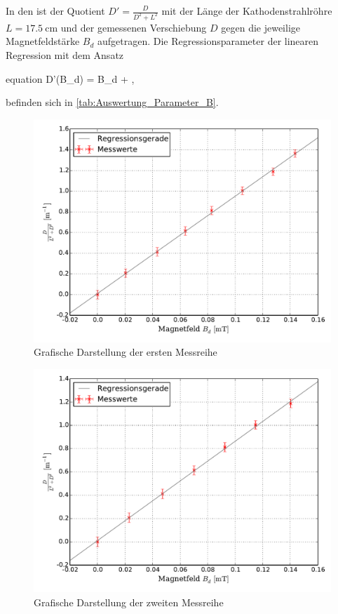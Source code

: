 		
		
		
		In den  
		ist der Quotient $D'=\frac{D}{D^{2} + L^{2}}$ mit der Länge der Kathodenstrahlröhre 
		$L = \SI{17.5}{\centi\meter}$ und der gemessenen Verschiebung $D$ gegen die
		jeweilige Magnetfeldstärke $B_{d}$ aufgetragen.
		Die Regressionsparameter der linearen Regression mit dem Ansatz
		\begin{empheq}{equation}
			D'(B_{d}) = \gamma \cdot B_{d} + \delta,
		\end{empheq} 
		befinden sich in \cref{tab:Auswertung_Parameter_B}.
		
		
		
		\begin{figure}[!h]
				\includegraphics[scale=0.7]{Grafiken/BFeld_Messreihe_I.pdf}
				\caption{Grafische Darstellung der ersten Messreihe}\label{fig:Auswertung_Messdaten_II_I}
		\end{figure}
		\begin{figure}[!h]
				\includegraphics[scale=0.7]{Grafiken/BFeld_Messreihe_II.pdf}
				\caption{Grafische Darstellung der zweiten Messreihe}\label{fig:Auswertung_Messdaten_II_II}
		\end{figure}
